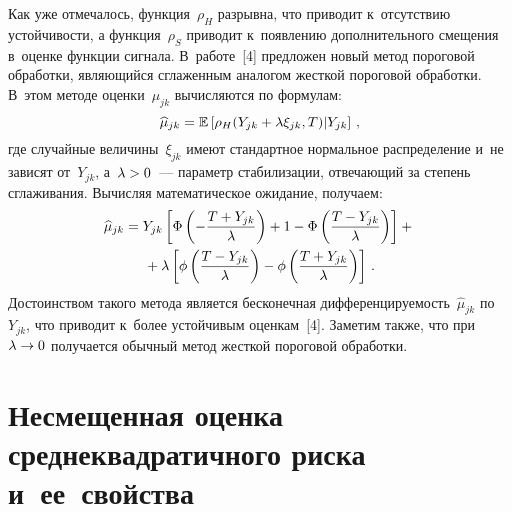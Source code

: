 \begin{multicols}{2}
Как уже отмечалось, функция~$\rho_{H}$ разрывна, что приводит 
к~отсутствию устойчивости, а функция~$\rho_{S}$ приводит к~появлению 
дополнительного смещения в~оценке функции сигнала. 
В~работе~[4] предложен новый метод пороговой обработки, являющийся 
сглаженным аналогом жесткой пороговой обработки. В~этом методе оценки~$\mu_{jk}$ 
вычисляются по формулам:
\begin{equation*}
\widehat{\mu}_{jk}=\mathbb{E} \left[\rho_{H}(Y_{jk}+\lambda\xi_{jk},T)|Y_{jk}\right]\,,
\end{equation*}
где случайные величины~$\xi_{jk}$ имеют стандартное нормальное распределение 
и~не зависят от~$Y_{jk}$, а~$\lambda\hm>0$~--- 
параметр стабилизации, отвечающий за степень сглаживания. Вычисляя математическое 
ожидание, получаем:
\begin{multline*}
\widehat{\mu}_{jk}=Y_{jk}\left[\Phi\left(-\displaystyle\frac{\displaystyle T+Y_{jk}\mathstrut}{\displaystyle \lambda\mathstrut}\right)+
1-\Phi\left(\displaystyle\frac{\displaystyle T-Y_{jk}\mathstrut}{\displaystyle \lambda\mathstrut}\right)\right]+{}\\
{}+
\lambda\left[\phi\left(\displaystyle\frac{\displaystyle T-Y_{jk}\mathstrut}{\displaystyle \lambda\mathstrut}\right)-
\phi\left(\displaystyle\frac{\displaystyle T+Y_{jk}\mathstrut}{\displaystyle \lambda\mathstrut}\right)\right]\,.
\end{multline*}
Достоинством такого метода является бесконечная 
дифференцируемость~$\widehat{\mu}_{jk}$ по~$Y_{jk}$, что приводит к~более 
устойчивым оценкам~[4]. Заметим также, что при $\lambda\hm\to0$ 
получается обычный метод жесткой пороговой обработки.

\section{Несмещенная оценка среднеквадратичного риска и~ее~свойства}


\end{multicols}
